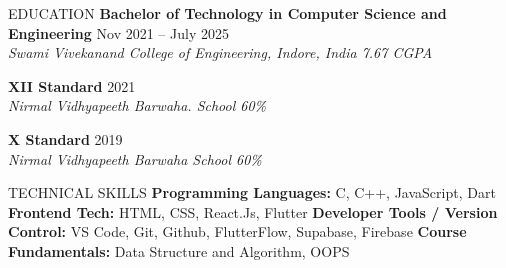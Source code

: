 \documentclass{shivam_resume} %
\begin{document}
\begin{rSection}{EDUCATION}
 {\bf Bachelor of Technology in Computer Science and Engineering} \hfill {Nov 2021 -- July 2025}\\
    \textit{Swami Vivekanand College of Engineering, Indore, India \hfill {7.67 CGPA}}
\vspace{0.2em}

 {\bf XII Standard} \hfill {2021}\\
    \textit{Nirmal Vidhyapeeth Barwaha. School \hfill {60\%}}
\vspace{0.2em}

 {\bf X Standard} \hfill {2019}\\
    \textit{Nirmal Vidhyapeeth Barwaha School \hfill {60\%}}
\vspace{-0.4em}
\end{rSection}

\begin{rSection}{TECHNICAL SKILLS}
\textbf{Programming Languages:} C, C++, JavaScript, Dart \newline
\textbf{Frontend Tech:} HTML, CSS, React.Js, Flutter \newline
\textbf{Developer Tools / Version Control:} VS Code, Git, Github, FlutterFlow, Supabase, Firebase \newline
\textbf{Course Fundamentals:} Data Structure and Algorithm, OOPS
\end{rSection}
\end{document}

